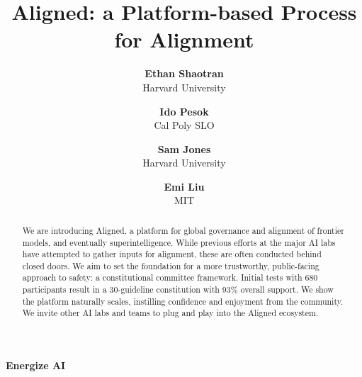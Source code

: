 \documentclass{article}
\date{}
\title{\textbf{Aligned: a Platform-based Process for Alignment}}
\author{
\textbf{\normalsize Ethan Shaotran}\correspondingauthor \\
{\normalsize Harvard University} \and
\textbf{\normalsize Ido Pesok}\footnotemark[1] \\
{\normalsize Cal Poly SLO} \and 
\textbf{\normalsize Sam Jones} \\
{\normalsize Harvard University} \and 
\textbf{\normalsize Emi Liu} \\
{\normalsize MIT}
}
\begin{document}
\maketitle
\vspace{-20mm}
\begin{center}
{\normalsize \textbf{Energize AI}}
\end{center}


\begin{abstract}
We are introducing Aligned, a platform for global governance and alignment of frontier models, and eventually superintelligence. While previous efforts at the major AI labs have attempted to gather inputs for alignment, these are often conducted behind closed doors. We aim to set the foundation for a more trustworthy, public-facing approach to safety: a constitutional committee framework. Initial tests with 680 participants result in a 30-guideline constitution with 93\% overall support. We show the platform naturally scales, instilling confidence and enjoyment from the community. We invite other AI labs and teams to plug and play into the Aligned ecosystem.
\end{abstract}

\vspace{0.5cm}
\end{document}
